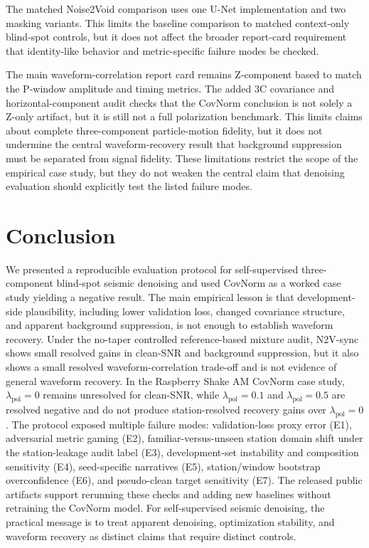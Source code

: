 \documentclass[review,12pt,authoryear]{elsarticle}
\newcommand{\lpol}{\lambda_{\mathrm{pol}}}
\begin{document}
The matched Noise2Void comparison uses one U-Net implementation and two masking variants. This limits the baseline comparison to matched context-only blind-spot controls, but it does not affect the broader report-card requirement that identity-like behavior and metric-specific failure modes be checked.

The main waveform-correlation report card remains Z-component based to match the P-window amplitude and timing metrics. The added 3C covariance and horizontal-component audit checks that the CovNorm conclusion is not solely a Z-only artifact, but it is still not a full polarization benchmark. This limits claims about complete three-component particle-motion fidelity, but it does not undermine the central waveform-recovery result that background suppression must be separated from signal fidelity. These limitations restrict the scope of the empirical case study, but they do not weaken the central claim that denoising evaluation should explicitly test the listed failure modes.

\section{Conclusion}
We presented a reproducible evaluation protocol for self-supervised three-component blind-spot seismic denoising and used CovNorm as a worked case study yielding a negative result. The main empirical lesson is that development-side plausibility, including lower validation loss, changed covariance structure, and apparent background suppression, is not enough to establish waveform recovery. Under the no-taper controlled reference-based mixture audit, N2V-sync shows small resolved gains in clean-SNR and background suppression, but it also shows a small resolved waveform-correlation trade-off and is not evidence of general waveform recovery. In the Raspberry Shake AM CovNorm case study, $\lpol=0$ remains unresolved for clean-SNR, while $\lpol=0.1$ and $\lpol=0.5$ are resolved negative and do not produce station-resolved recovery gains over $\lpol=0$. The protocol exposed multiple failure modes: validation-loss proxy error (E1), adversarial metric gaming (E2), familiar-versus-unseen station domain shift under the station-leakage audit label (E3), development-set instability and composition sensitivity (E4), seed-specific narratives (E5), station/window bootstrap overconfidence (E6), and pseudo-clean target sensitivity (E7). The released public artifacts support rerunning these checks and adding new baselines without retraining the CovNorm model. For self-supervised seismic denoising, the practical message is to treat apparent denoising, optimization stability, and waveform recovery as distinct claims that require distinct controls.
\end{document}
